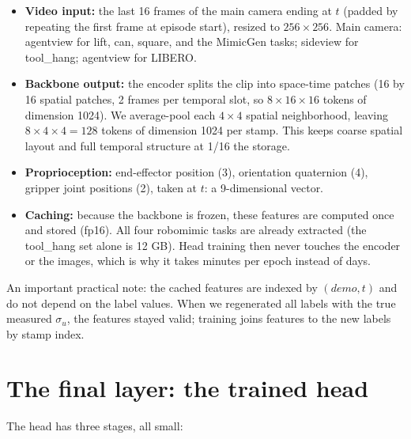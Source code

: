 \documentclass[11pt]{article}
\begin{document}
\begin{itemize}[leftmargin=2em]
  \item \textbf{Video input:} the last 16 frames of the main camera ending at $t$
        (padded by repeating the first frame at episode start), resized to
        $256 \times 256$. Main camera: agentview for lift, can, square, and the
        MimicGen tasks; sideview for tool\_hang; agentview for LIBERO.
  \item \textbf{Backbone output:} the encoder splits the clip into space-time
        patches (16 by 16 spatial patches, 2 frames per temporal slot, so
        $8 \times 16 \times 16$ tokens of dimension 1024). We average-pool each
        $4 \times 4$ spatial neighborhood, leaving $8 \times 4 \times 4 = 128$
        tokens of dimension 1024 per stamp. This keeps coarse spatial layout and
        full temporal structure at 1/16 the storage.
  \item \textbf{Proprioception:} end-effector position (3), orientation quaternion
        (4), gripper joint positions (2), taken at $t$: a 9-dimensional vector.
  \item \textbf{Caching:} because the backbone is frozen, these features are
        computed once and stored (fp16). All four robomimic tasks are already
        extracted (the tool\_hang set alone is 12 GB). Head training then never
        touches the encoder or the images, which is why it takes minutes per epoch
        instead of days.
\end{itemize}

An important practical note: the cached features are indexed by $(demo, t)$ and do
not depend on the label values. When we regenerated all labels with the true
measured $\sigma_u$, the features stayed valid; training joins features to the new
labels by stamp index.

\section{The final layer: the trained head}

The head has three stages, all small:
\end{document}
